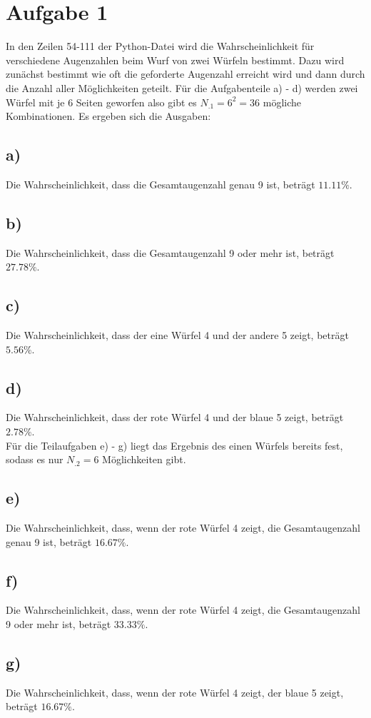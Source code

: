 \section{Aufgabe 1}
\label{sec:Aufgabe1}
In den Zeilen 54-111 der Python-Datei wird die Wahrscheinlichkeit für verschiedene Augenzahlen beim Wurf von zwei Würfeln bestimmt. Dazu wird zunächst bestimmt wie oft die geforderte Augenzahl erreicht wird und dann durch die Anzahl aller Möglichkeiten geteilt.
Für die Aufgabenteile a) - d) werden zwei Würfel mit je 6 Seiten geworfen
also gibt es $N_.1=6^2=36$ mögliche Kombinationen. 
Es ergeben sich die Ausgaben:

\subsection*{a)}

Die Wahrscheinlichkeit, dass die Gesamtaugenzahl genau 9 ist, beträgt $11.11\%$.

\subsection*{b)}

Die Wahrscheinlichkeit, dass die Gesamtaugenzahl 9 oder mehr ist, beträgt $27.78\%$.

\subsection*{c)}

Die Wahrscheinlichkeit, dass der eine Würfel 4 und der andere 5 zeigt, beträgt $5.56\%$.

\subsection*{d)}

Die Wahrscheinlichkeit, dass der rote Würfel 4 und der blaue 5 zeigt, beträgt $2.78\%$.\\

\noindent Für die Teilaufgaben e) - g) liegt das Ergebnis des einen Würfels bereits fest, sodass es nur $N_.2=6$ Möglichkeiten gibt.

\subsection*{e)}

Die Wahrscheinlichkeit, dass, wenn der rote Würfel 4 zeigt, die Gesamtaugenzahl genau 9 ist, beträgt $16.67\%$.

\subsection*{f)}

Die Wahrscheinlichkeit, dass, wenn der rote Würfel 4 zeigt, die Gesamtaugenzahl 9 oder mehr ist, beträgt $33.33\%$.

\subsection*{g)}

Die Wahrscheinlichkeit, dass, wenn der rote Würfel 4 zeigt, der blaue 5 zeigt, beträgt $16.67\%$.